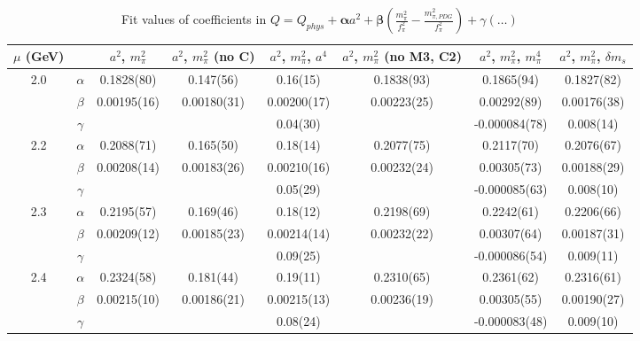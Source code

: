 \documentclass[12pt]{extarticle}
\begin{document}
\begin{table}[h!]
\begin{center}
\begin{tabular}{|c c|c|c|c|c|c|c|}
\hline
$\mu$ (GeV) &  & $a^2$, $m_\pi^2$& $a^2$, $m_\pi^2$ (no C)& $a^2$, $m_\pi^2$, $a^4$& $a^2$, $m_\pi^2$ (no M3, C2)& $a^2$, $m_\pi^2$, $m_\pi^4$& $a^2$, $m_\pi^2$, $\delta m_s$\\
\hline
\multirow{3}{0.5in}{2.0} & $\alpha$ & 0.1828(80)& 0.147(56)& 0.16(15)& 0.1838(93)& 0.1865(94)& 0.1827(82)\\
 & $\beta$ & 0.00195(16)& 0.00180(31)& 0.00200(17)& 0.00223(25)& 0.00292(89)& 0.00176(38)\\
 & $\gamma$ &  &  & 0.04(30)&  & -0.000084(78)& 0.008(14)\\
\hline
\multirow{3}{0.5in}{2.2} & $\alpha$ & 0.2088(71)& 0.165(50)& 0.18(14)& 0.2077(75)& 0.2117(70)& 0.2076(67)\\
 & $\beta$ & 0.00208(14)& 0.00183(26)& 0.00210(16)& 0.00232(24)& 0.00305(73)& 0.00188(29)\\
 & $\gamma$ &  &  & 0.05(29)&  & -0.000085(63)& 0.008(10)\\
\hline
\multirow{3}{0.5in}{2.3} & $\alpha$ & 0.2195(57)& 0.169(46)& 0.18(12)& 0.2198(69)& 0.2242(61)& 0.2206(66)\\
 & $\beta$ & 0.00209(12)& 0.00185(23)& 0.00214(14)& 0.00232(22)& 0.00307(64)& 0.00187(31)\\
 & $\gamma$ &  &  & 0.09(25)&  & -0.000086(54)& 0.009(11)\\
\hline
\multirow{3}{0.5in}{2.4} & $\alpha$ & 0.2324(58)& 0.181(44)& 0.19(11)& 0.2310(65)& 0.2361(62)& 0.2316(61)\\
 & $\beta$ & 0.00215(10)& 0.00186(21)& 0.00215(13)& 0.00236(19)& 0.00305(55)& 0.00190(27)\\
 & $\gamma$ &  &  & 0.08(24)&  & -0.000083(48)& 0.009(10)\\
\hline
\end{tabular}
\caption{Fit values of coefficients in $Q = Q_{phys} + \mathbf{\alpha} a^2 + \mathbf{\beta}\left(\frac{m_\pi^2}{f_\pi^2}-\frac{m_{\pi,PDG}^2}{f_\pi^2}\right) + \gamma(\ldots)$}
\end{center}
\end{table}






\end{document}

